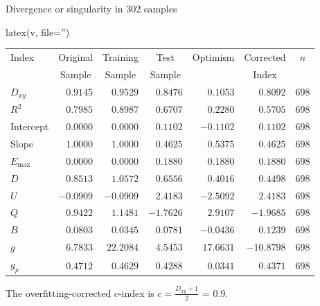 Divergence or singularity in 302 samples
\begin{Sinput}
latex(v, file='')
\end{Sinput}
\Needspace{2in}
\begin{center}\normalsize
\begin{tabular}{lrrrrrr}
\hline\hline
\multicolumn{1}{l}{Index}&\multicolumn{1}{c}{Original}&\multicolumn{1}{c}{Training}&\multicolumn{1}{c}{Test}&\multicolumn{1}{c}{Optimism}&\multicolumn{1}{c}{Corrected}&\multicolumn{1}{c}{$n$}\tabularnewline
&\multicolumn{1}{c}{{\normalsize Sample}}&\multicolumn{1}{c}{{\normalsize Sample}}&\multicolumn{1}{c}{{\normalsize Sample}}&&\multicolumn{1}{c}{{\normalsize Index}}&\tabularnewline
\hline
$D_{xy}$&$ 0.9145$&$ 0.9529$&$ 0.8476$&$ 0.1053$&$  0.8092$&$698$\tabularnewline
$R^{2}$&$ 0.7985$&$ 0.8987$&$ 0.6707$&$ 0.2280$&$  0.5705$&$698$\tabularnewline
Intercept&$ 0.0000$&$ 0.0000$&$ 0.1102$&$-0.1102$&$  0.1102$&$698$\tabularnewline
Slope&$ 1.0000$&$ 1.0000$&$ 0.4625$&$ 0.5375$&$  0.4625$&$698$\tabularnewline
$E_{\max}$&$ 0.0000$&$ 0.0000$&$ 0.1880$&$ 0.1880$&$  0.1880$&$698$\tabularnewline
$D$&$ 0.8513$&$ 1.0572$&$ 0.6556$&$ 0.4016$&$  0.4498$&$698$\tabularnewline
$U$&$-0.0909$&$-0.0909$&$ 2.4183$&$-2.5092$&$  2.4183$&$698$\tabularnewline
$Q$&$ 0.9422$&$ 1.1481$&$-1.7626$&$ 2.9107$&$ -1.9685$&$698$\tabularnewline
$B$&$ 0.0803$&$ 0.0345$&$ 0.0781$&$-0.0436$&$  0.1239$&$698$\tabularnewline
$g$&$ 6.7833$&$22.2084$&$ 4.5453$&$17.6631$&$-10.8798$&$698$\tabularnewline
$g_{p}$&$ 0.4712$&$ 0.4629$&$ 0.4288$&$ 0.0341$&$  0.4371$&$698$\tabularnewline
\hline
\end{tabular}
\end{center}

The overfitting-corrected $c$-index is $c = \frac{D_{xy} + 1}{2}$ =
0.9.

